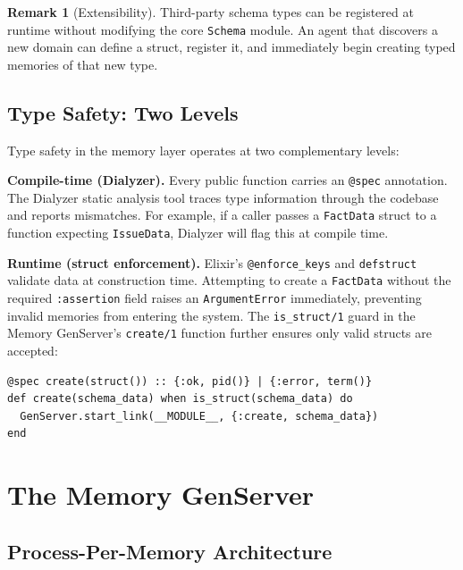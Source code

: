 \documentclass[12pt,a4paper]{article}
\theoremstyle{definition}
\newtheorem{remark}[theorem]{Remark}
\begin{document}
\begin{remark}[Extensibility]
Third-party schema types can be registered at runtime without modifying the core \texttt{Schema} module.
An agent that discovers a new domain can define a struct, register it, and immediately begin creating typed memories of that new type.
\end{remark}

\subsection{Type Safety: Two Levels}\label{subsec:type-safety}

Type safety in the memory layer operates at two complementary levels:

\textbf{Compile-time (Dialyzer).}
Every public function carries an \texttt{@spec} annotation.
The Dialyzer static analysis tool traces type information through the codebase and reports mismatches.
For example, if a caller passes a \texttt{FactData} struct to a function expecting \texttt{IssueData}, Dialyzer will flag this at compile time.

\textbf{Runtime (struct enforcement).}
Elixir's \texttt{@enforce\_keys} and \texttt{defstruct} validate data at construction time.
Attempting to create a \texttt{FactData} without the required \texttt{:assertion} field raises an \texttt{ArgumentError} immediately, preventing invalid memories from entering the system.
The \texttt{is\_struct/1} guard in the Memory GenServer's \texttt{create/1} function further ensures only valid structs are accepted:

\begin{lstlisting}[caption={Guard clause ensures only structs enter the system.}, label={lst:guard}]
@spec create(struct()) :: {:ok, pid()} | {:error, term()}
def create(schema_data) when is_struct(schema_data) do
  GenServer.start_link(__MODULE__, {:create, schema_data})
end
\end{lstlisting}

\section{The Memory GenServer}\label{sec:memory-genserver}

\subsection{Process-Per-Memory Architecture}\label{subsec:process-per-memory}
\end{document}
